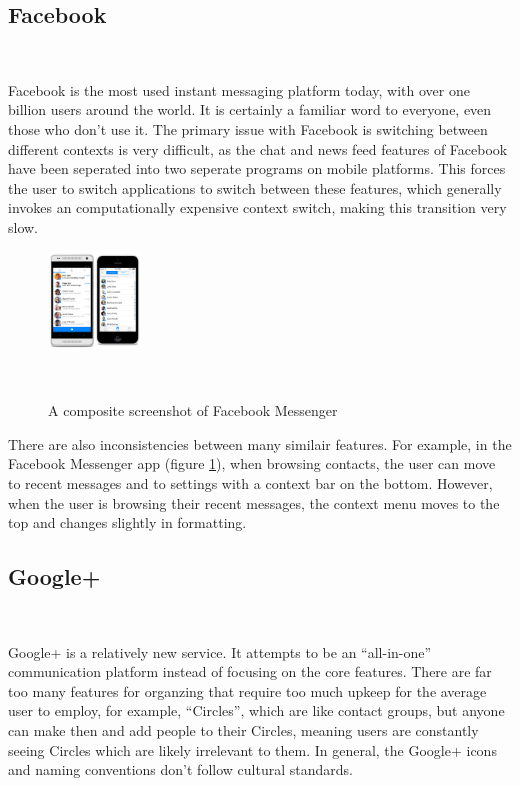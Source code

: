 \documentclass{sigchi}
\begin{document}
\subsection{Facebook}~\label{subsec:Facebook}

Facebook is the most used instant messaging platform today, with over one
billion users around the world. It is certainly a familiar word to everyone,
even those who don't use it. The primary issue with Facebook is switching
between different contexts is very difficult, as the chat and news feed features
of Facebook have been seperated into two seperate programs on mobile platforms.
This forces the user to switch applications to switch between these features,
which generally invokes an computationally expensive context switch, making this
transition very slow.

\begin{figure}
  \centering\includegraphics[width=0.22\textwidth]{figures/fb_msg}
  \caption{A composite screenshot of Facebook Messenger}~\label{fig:fbMsg}
\vspace{-20pt}
\end{figure}

There are also inconsistencies between many similair features. For
example, in the Facebook Messenger app (figure \ref{fig:fbMsg}), when browsing
contacts, the user can move to recent messages and to settings with a context
bar on the bottom. However, when the user is browsing their recent messages, 
the context menu moves to the top and changes slightly in formatting. 

\subsection{Google+}~\label{subsec:google}

Google+ is a relatively new service. It attempts to be an ``all-in-one''
communication platform instead of focusing on the core features. There are far
too many features for organzing that require too much upkeep for the average
user to employ, for example, ``Circles'', which are like contact groups, but
anyone can make then and add people to their Circles, meaning users are
constantly seeing Circles which are likely irrelevant to them. In general, the
Google+ icons and naming conventions don't follow cultural standards.
\end{document}
